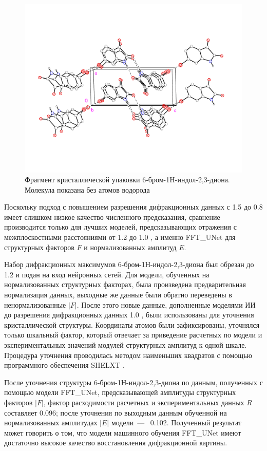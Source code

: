\begin{figure}[H]
	\centering
	\includegraphics[width=1\textwidth]{figures/2.pdf}
	\caption{Фрагмент кристаллической упаковки 6-бром-1H-индол-2,3-диона. Молекула показана без атомов водорода}
	\label{struc}
\end{figure}

Поскольку подход с повышением разрешения дифракционных данных с 1.5 \text{\AA} до 0.8 \text{\AA} имеет слишком низкое качество численного предсказания, сравнение производится только для лучших моделей, предсказывающих отражения с межплоскостными расстояниями от 1.2 \text{\AA} до 1.0 \text{\AA}, а именно FFT\_UNet для структурных факторов $F$ и нормализованных амплитуд $E$.  

Набор дифракционных максимумов 6-бром-1Н-индол-2,3-диона был обрезан до 1.2 \text{\AA} и подан на вход нейронных сетей. Для модели, обученных на нормализованных структурных факторах, была произведена предварительная нормализация данных, выходные же данные были обратно переведены в ненормализованные $|F|$. После этого новые данные, дополненные моделями ИИ до разрешения дифракционных данных 1.0 \text{\AA}, были использованы для уточнения кристаллической структуры. Координаты атомов были зафиксированы, уточнялся только шкальный фактор, который отвечает за приведение расчетных по модели и экспериментальных значений модулей структурных амплитуд к одной шкале. Процедура уточнения проводилась методом наименьших квадратов с помощью программного обеспечения SHELXT \cite{sheldrick_shelxt_2015}. 

После уточнения структуры 6-бром-1Н-индол-2,3-диона по данным, полученных с помощью модели FFT\_UNet, предсказывающей амплитуды структурных факторов $|F|$, фактор расходимости расчетных и экспериментальных данных $R$ составляет 0.096; после уточнения по выходным данным обученной на нормализованных амплитудах $|E|$ модели~---~ 0.102. Полученный результат может говорить о том, что модели машинного обучения FFT\_UNet имеют достаточно высокое качество восстановления дифракционной картины.


